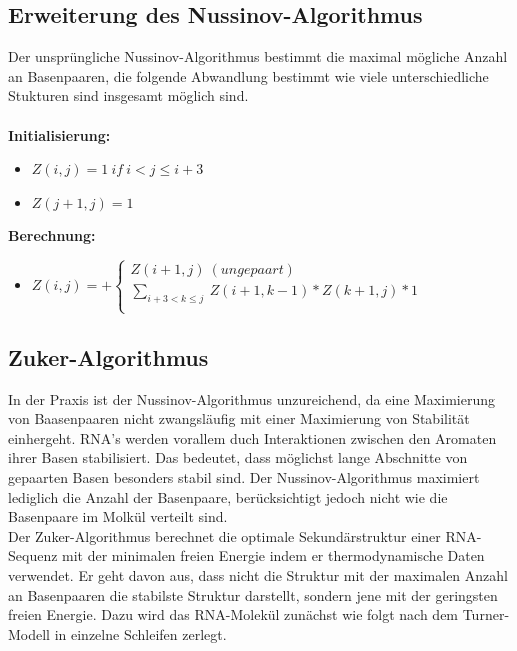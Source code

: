 \subsection{Erweiterung des Nussinov-Algorithmus}

Der unspr\"ungliche Nussinov-Algorithmus bestimmt die maximal m\"ogliche Anzahl an Basenpaaren, die folgende Abwandlung bestimmt wie viele unterschiedliche Stukturen sind insgesamt m\"oglich sind.
\\\\
\textbf{Initialisierung:}
\begin{itemize}
	\item[] $Z(i,j)=1\ if\ i<j\le i+3$ 
	\item[] $Z(j+1, j) = 1$
\end{itemize}
\textbf{Berechnung:}
\begin{itemize}
	\item[]$Z(i,j)=+ \begin{cases}
               Z(i+1, j)\ (ungepaart)\\
               \displaystyle\sum_{i+3<k \le j}\ Z(i+1, k-1) * Z(k+1, j) * 1\\
\end{cases}$
\end{itemize}


\subsection{Zuker-Algorithmus}


In der Praxis ist der Nussinov-Algorithmus unzureichend, da eine Maximierung von Baasenpaaren nicht zwangsl\"aufig mit einer Maximierung von Stabilit\"at einhergeht. RNA's werden vorallem duch Interaktionen zwischen den Aromaten ihrer Basen stabilisiert. Das bedeutet, dass m\"oglichst lange Abschnitte von gepaarten Basen besonders stabil sind. Der Nussinov-Algorithmus maximiert lediglich die Anzahl der Basenpaare, ber\"ucksichtigt jedoch nicht wie die Basenpaare im Molkül verteilt sind. 
\\
Der Zuker-Algorithmus berechnet die optimale Sekundärstruktur einer RNA-Sequenz mit der minimalen freien Energie indem er thermodynamische Daten verwendet. Er geht davon aus, dass nicht die Struktur mit der maximalen Anzahl an Basenpaaren die stabilste Struktur darstellt, sondern jene mit der geringsten freien Energie. Dazu wird das RNA-Molek\"ul zunächst wie folgt nach dem Turner-Modell in einzelne Schleifen zerlegt.

